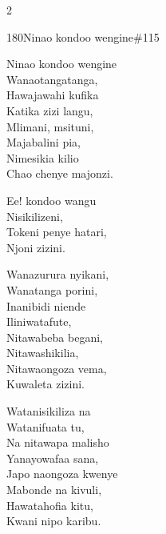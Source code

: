 \documentclass{article}
\begin{document}
\begin{multicols}{2}
\begin{hymn}{180}{Ninao kondoo wengine}{\#115}
\begin{stanza}
Ninao kondoo wengine\\
Wanaotangatanga,\\
Hawajawahi kufika\\
Katika zizi langu,\\
Mlimani, msituni,\\
Majabalini pia,\\
Nimesikia kilio\\
Chao chenye majonzi.
\end{stanza}
\begin{chorus}
Ee! kondoo wangu\\
Nisikilizeni,\\
Tokeni penye hatari,\\
Njoni zizini.
\end{chorus}
\begin{stanza}
Wanazurura nyikani,\\
Wanatanga porini,\\
Inanibidi niende\\
Iliniwatafute,\\
Nitawabeba begani,\\
Nitawashikilia,\\
Nitawaongoza vema,\\
Kuwaleta zizini.
\end{stanza}
\begin{stanza}
Watanisikiliza na\\
Watanifuata tu,\\
Na nitawapa malisho\\
Yanayowafaa sana,\\
Japo naongoza kwenye\\
Mabonde na kivuli,\\
Hawatahofia kitu,\\
Kwani nipo karibu.
\end{stanza}
\end{hymn}


\end{multicols}
\end{document}
